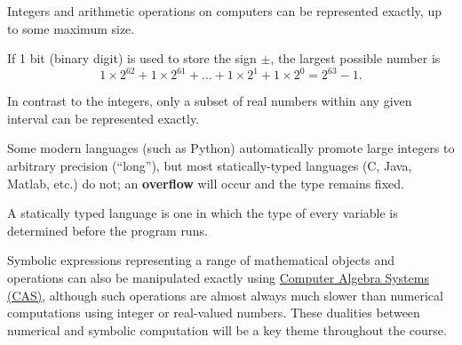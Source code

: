 \documentclass[
  letterpaper,
  DIV=11,
  numbers=noendperiod]{scrreprt}
\begin{document}
Integers and arithmetic operations on computers can be represented
exactly, up to some maximum size.

If 1 bit (binary digit) is used to store the sign \(\pm\), the largest
possible number is \[
1\times 2^{62} +1\times 2^{61} + \ldots + 1\times 2^{1} + 1\times 2^{0} = 2^{63}-1.
\]

In contrast to the integers, only a subset of real numbers within any
given interval can be represented exactly.

\begin{tcolorbox}[enhanced jigsaw, bottomrule=.15mm, colbacktitle=quarto-callout-note-color!10!white, breakable, arc=.35mm, coltitle=black, colback=white, bottomtitle=1mm, opacityback=0, title=\textcolor{quarto-callout-note-color}{\faInfo}\hspace{0.5em}{Note}, titlerule=0mm, toptitle=1mm, opacitybacktitle=0.6, colframe=quarto-callout-note-color-frame, leftrule=.75mm, rightrule=.15mm, left=2mm, toprule=.15mm]

Some modern languages (such as Python) automatically promote large
integers to arbitrary precision (``long''), but most statically-typed
languages (C, Java, Matlab, etc.) do not; an \textbf{overflow} will
occur and the type remains fixed.

\end{tcolorbox}

\begin{tcolorbox}[enhanced jigsaw, bottomrule=.15mm, colbacktitle=quarto-callout-note-color!10!white, breakable, arc=.35mm, coltitle=black, colback=white, bottomtitle=1mm, opacityback=0, title=\textcolor{quarto-callout-note-color}{\faInfo}\hspace{0.5em}{Note}, titlerule=0mm, toptitle=1mm, opacitybacktitle=0.6, colframe=quarto-callout-note-color-frame, leftrule=.75mm, rightrule=.15mm, left=2mm, toprule=.15mm]

A statically typed language is one in which the type of every variable
is determined before the program runs.

\end{tcolorbox}

Symbolic expressions representing a range of mathematical objects and
operations can also be manipulated exactly using
\href{https://en.wikipedia.org/wiki/Computer_algebra_system}{Computer
Algebra Systems (CAS)}, although such operations are almost always much
slower than numerical computations using integer or real-valued numbers.
These dualities between numerical and symbolic computation will be a key
theme throughout the course.
\end{document}
